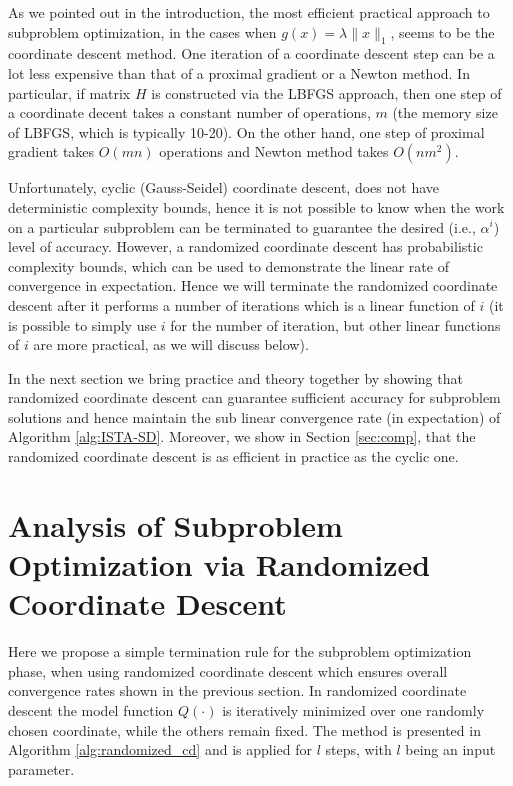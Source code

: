\documentclass[11pt]{article}
\numberwithin{equation}{section}
\begin{document}
As we pointed out in the introduction, the most efficient  practical approach to subproblem optimization, in the cases when  $g(x)=\lambda \|x\|_1$, seems to be the coordinate descent method. One iteration of a coordinate descent step can be a lot less expensive 
than that of a proximal gradient or a Newton method. In particular, if matrix $H$ is constructed via the LBFGS approach, then one step of a coordinate decent takes a constant number 
of operations, $m$ (the memory size of LBFGS, which is typically 10-20). On the other hand, one step of proximal gradient takes $O(mn)$ operations and Newton method takes $O(nm^2)$. 

Unfortunately,  cyclic (Gauss-Seidel) coordinate descent, does not have deterministic complexity bounds, hence it is not possible to know when the work on a particular subproblem can be terminated to guarantee the desired (i.e.,  $\alpha^i$) level of accuracy. However, a randomized coordinate descent has probabilistic complexity bounds, which can be used to demonstrate the linear rate of convergence in expectation. Hence we will terminate the randomized coordinate descent after it performs a number of iterations which is a linear function of $i$ (it is possible to simply use $i$ for the number of iteration, but other linear functions of $i$ are more practical, as we will discuss below). 

In the next section we bring practice and theory together by showing that randomized coordinate descent can guarantee sufficient accuracy for subproblem solutions and hence maintain the sub linear convergence rate (in expectation) of Algorithm \ref{alg:ISTA-SD}. Moreover, we show in Section \ref{sec:comp}, that the randomized coordinate descent is as efficient in practice as the cyclic one. 


\section{Analysis of Subproblem Optimization via Randomized Coordinate Descent} %
\label{sec:coordinate_descent_iteration_complexity}
Here we propose a simple termination rule for the subproblem optimization phase,  when using randomized coordinate descent  which ensures overall convergence rates shown in the previous section.  In randomized coordinate descent the model function $Q(\cdot)$ is iteratively minimized over one randomly chosen coordinate, while the others remain fixed. 
The method  is presented in Algorithm \ref{alg:randomized_cd} and is applied for $l$ steps, with $l$ being an input parameter. 
\end{document}

